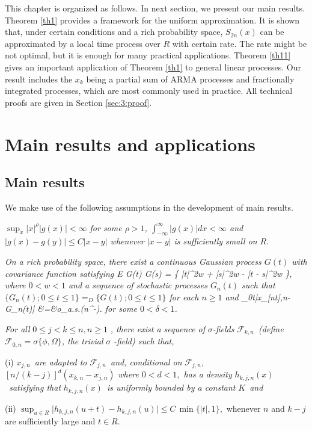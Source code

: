This chapter is organized as follows.  In next section, we present our
main results. Theorem \ref {th1} provides a framework for the uniform approximation. It is shown that, under certain conditions and a rich probability space, $S_{2n}(x)$ can be approximated by a local time process over $R$ with certain rate. The rate might be not optimal, but it is enough for many practical applications.
Theorem \ref {th11} gives an important application of
Theorem \ref {th1} to general linear processes. Our result includes
 the $x_k$ being a partial sum of ARMA processes and fractionally integrated processes, which are most commonly used in practice. All technical proofs are given in Section \ref{sec:3:proof}.



\section{Main results and applications}
\subsection{Main results}

We make use of the following assumptions in the development of main results.

\begin{assump}  \textit{
$\sup_x |x|^{\rho} |g(x)|<\infty$ for some $\rho > 1$, $\int_{-\infty}^{\infty}|g(x)|dx<\infty$ \textit{and }\
$|g(x)-g(y)|\le C|x-y|$ whenever  $|x-y|$ is sufficiently small on }$R$.
\end{assump}


\begin{assump} 
 \textit{On a rich probability space, there exist a continuous Gaussian process $G(t)$ with covariance function satisfying
 \be
E G(t) G(s) =  \{ |t|^{2w} + |s|^{2w} - |t - s|^{2w} \},
\ee
where $0 < w < 1$ and a sequence of stochastic processes $G_n(t)$  such that $\{G_n(t); 0 \le t \le 1\} =_D \{G(t); 0 \le t \le 1\}$ for each $n \ge 1$ and
\be
 \sup_{0\le t}|x_{[nt],n}-G_n(t)| &=&o_{a.s.}(n^{-\delta}).
 \la {a2}
\ee
for some $0<\delta<1$. }
\end{assump}

\begin{assump} 
 \textit{For all }$0\leq j<k\leq n,n\geq 1$%
\textit{, there exist  a
sequence of }$\sigma $\textit{-fields }${\mathcal F}_{k,n}$\textit{\ (define }$%
{\mathcal F}_{0,n}=\sigma \{\phi ,\Omega \}$\textit{, the trivial }$\sigma $\textit{%
-field) such that,}

(i) $x_{j,n}$\textit{\ are adapted to }${\mathcal F}_{j,n}$\textit{\
and, conditional on }${\mathcal F}_{j,n}$\textit{,
}$[n/(k-j)]^d(x_{k,n}-x_{j,n})$\textit{ where $0<d<1,$ has a density
}$h_{k,j,n}(x)$\textit{\ satisfying that }$h_{k,j,n}(x)$\textit{\ is
uniformly bounded by a constant }$K$\textit{\ and }%

(ii) $  \sup_{u\in R}\big|h_{k,j,n}(u+t)-h_{k,j,n}(u)\big|\le C\, \min\{|t|, 1\},$
whenever $n$ and $k-j$ are sufficiently large and $t\in R$.
\end{assump}

